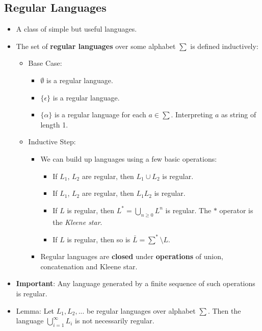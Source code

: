 \subsection{Regular Languages}
\begin{itemize}
    \item A class of simple but useful languages.
    \item The set of \textbf{regular languages} over some alphabet $\sum$ is defined inductively:
    \begin{itemize}
        \item Base Case:
        \begin{itemize}
            \item $\emptyset$ is a regular language.
            \item $\{\epsilon\}$ is a regular language.
            \item $\{ \alpha \}$ is a regular language for each $a \in \sum$. Interpreting $a$ as string of length 1.
        \end{itemize}
        \item Inductive Step:
        \begin{itemize}
            \item We can build up languages using a few basic operations:
            \begin{itemize}
                \item If $L_1$, $L_2$ are regular, then $L_1 \cup L_2$ is regular.
                \item If $L_1$, $L_2$ are regular, then $L_1 L_2$ is regular.
                \item If $L$ is regular, then $L^{\ast} = \bigcup_{n \geq 0} L^n$ is regular. The $\ast$ operator is the \textit{Kleene star}.
                \item If $L$ is regular, then so is $\bar{L} = \sum^{\ast} \setminus L$.
            \end{itemize}
            \item Regular languages are \textbf{closed} under \textbf{operations} of union, concatenation and Kleene star.
        \end{itemize}
    \end{itemize}
    \item \textbf{Important}: Any language generated by a finite sequence of such operations is regular.
    \item Lemma: Let $L_1, L_2, ...$ be regular languages over alphabet $\sum$. Then the language $\bigcup_{i=1}^{\infty} L_i$ is not necessarily regular.
\end{itemize}

